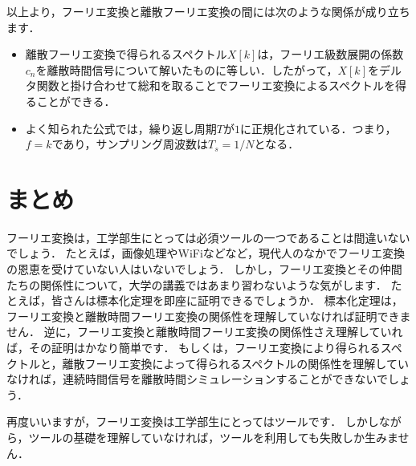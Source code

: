 以上より，フーリエ変換と離散フーリエ変換の間には次のような関係が成り立ちます．
\begin{itemize}
\item 離散フーリエ変換で得られるスペクトル$X[k]$は，フーリエ級数展開の係数$c_n$を離散時間信号について解いたものに等しい．したがって，$X[k]$をデルタ関数と掛け合わせて総和を取ることでフーリエ変換によるスペクトルを得ることができる．
\item よく知られた公式では，繰り返し周期$T$が$1$に正規化されている．つまり，$f=k$であり，サンプリング周波数は$T_s = 1/N$となる．
\end{itemize}


\section{まとめ}

フーリエ変換は，工学部生にとっては必須ツールの一つであることは間違いないでしょう．
たとえば，画像処理やWiFiなどなど，現代人のなかでフーリエ変換の恩恵を受けていない人はいないでしょう．
しかし，フーリエ変換とその仲間たちの関係性について，大学の講義ではあまり習わないような気がします．
たとえば，皆さんは標本化定理を即座に証明できるでしょうか．
標本化定理は，フーリエ変換と離散時間フーリエ変換の関係性を理解していなければ証明できません．
逆に，フーリエ変換と離散時間フーリエ変換の関係性さえ理解していれば，その証明はかなり簡単です．
もしくは，フーリエ変換により得られるスペクトルと，離散フーリエ変換によって得られるスペクトルの関係性を理解していなければ，連続時間信号を離散時間シミュレーションすることができないでしょう．

再度いいますが，フーリエ変換は工学部生にとってはツールです．
しかしながら，ツールの基礎を理解していなければ，ツールを利用しても失敗しか生みません．
